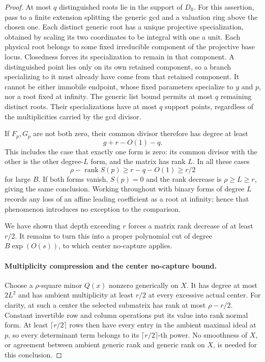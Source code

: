 \begin{proof}
At most $q$ distinguished roots lie in the support of $D_0$. For this assertion, pass to a finite extension splitting the generic gcd and a valuation ring above the chosen one. Each distinct generic root has a unique projective specialization, obtained by scaling its two coordinates to be integral with one a unit. Each physical root belongs to some fixed irreducible component of the projective base locus. Closedness forces its specialization to remain in that component. A distinguished point lies only on its own retained component, so a branch specializing to it must already have come from that retained component. It cannot be either immobile endpoint, whose fixed parameters specialize to $y$ and $p$, nor a root fixed at infinity. The generic list bound permits at most $q$ remaining distinct roots. Their specializations have at most $q$ support points, regardless of the multiplicities carried by the gcd divisor.

If $F_p,G_p$ are not both zero, their common divisor therefore has degree at least
\[
 g+r-O(1)-q.
\]
This includes the case that exactly one form is zero: its common divisor with the other is the other degree-$L$ form, and the matrix has rank $L$. In all these cases
\[
 \rho-\operatorname{rank}S(p)\ge r-q-O(1)\ge r/2
\]
for large $B$. If both forms vanish, $S(p)=0$ and the rank decrease is $\rho\ge L\ge r$, giving the same conclusion. Working throughout with binary forms of degree $L$ records any loss of an affine leading coefficient as a root at infinity; hence that phenomenon introduces no exception to the comparison.

We have shown that depth exceeding $r$ forces a matrix rank decrease of at least $r/2$.  It remains to turn this into a proper polynomial cut of degree $B\exp(O(s))$, to which center no-capture applies.

\paragraph{Multiplicity compression and the center no-capture bound.}
Choose a $\rho$-square minor $Q(x)$ nonzero generically on $X$. It has degree at most $2L^2$ and has ambient multiplicity at least $r/2$ at every excessive actual center. For clarity, at such a center the selected submatrix has rank at most $\rho-r/2$. Constant invertible row and column operations put its value into rank normal form. At least $\lceil r/2\rceil$ rows then have every entry in the ambient maximal ideal at $p$, so every determinant term belongs to its $\lceil r/2\rceil$-th power. No smoothness of $X$, or agreement between ambient generic rank and generic rank on $X$, is needed for this conclusion.


\end{proof}
